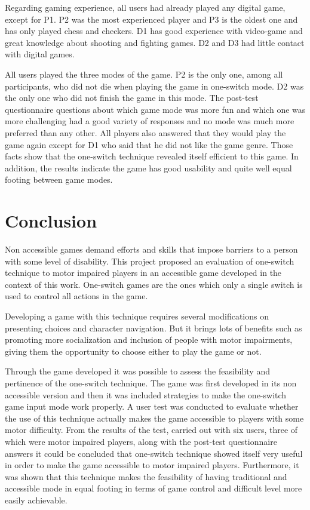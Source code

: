 \documentclass[a4paper]{sbgames}               %
\begin{document}
Regarding gaming experience, all users had already played any digital game, except for P1. P2 was the most experienced player and P3 is the oldest one and has only played chess and checkers. D1 has good experience with video-game and great knowledge about shooting and fighting games. D2 and D3 had little contact with digital games.

All users played the three modes of the game. P2 is the only one, among all participants, who did not die when playing the game in one-switch mode. D2 was the only one who did not finish the game in this mode. The post-test questionnaire questions about which game mode was more fun and which one was more challenging had a good variety of responses and no mode was much more preferred than any other. All players also answered that they would play the game again except for D1 who said that he did not like the game genre. Those facts show that the one-switch technique revealed itself efficient to this game. In addition, the results indicate the game has good usability and quite well equal footing between game modes.

\section{Conclusion}
\label{sec:conclusion}
Non accessible games demand efforts and skills that impose barriers to a person with some level of disability. This project proposed an evaluation of one-switch technique to motor impaired players in an accessible game developed in the context of this work. One-switch games are the ones which only a single switch is used to control all actions in the game.

Developing a game with this technique requires several modifications on presenting choices and character navigation. But it brings lots of benefits such as promoting more socialization and inclusion of people with motor impairments, giving them the opportunity to choose either to play the game or not.

Through the game developed it was possible to assess the feasibility and pertinence of the one-switch technique. The game was first developed in its non accessible version and then it was included strategies to make the one-switch game input mode work properly. A user test was conducted to evaluate whether the use of this technique actually makes the game accessible to players with some motor difficulty. From the results of the test, carried out with six users, three of which were motor impaired players, along with the post-test questionnaire answers it could be concluded that one-switch technique showed itself very useful in order to make the game accessible to motor impaired players. Furthermore, it was shown that this technique makes the feasibility of having traditional and accessible mode in equal footing in terms of game control and difficult level more easily achievable.
\end{document}

